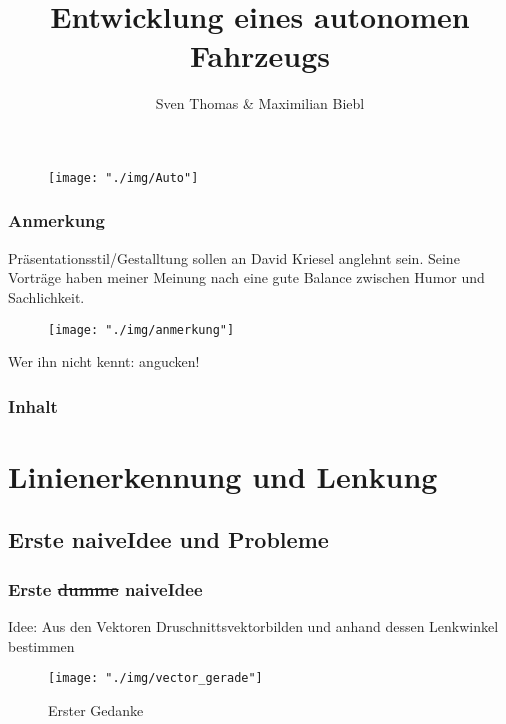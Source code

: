 \documentclass{beamer}
\title[]{Entwicklung eines autonomen Fahrzeugs}
\author{Sven Thomas \& Maximilian Biebl}
\institute[THM]{Technische Hochschule Mittelhessen}
\date{}
\begin{document}
	\begin{frame}
		\begin{center}
				\begin{figure}[h]
					\texttt{[image: "./img/Auto"]}
					\label{fig:Auto}
				\end{figure}
		\end{center}
		\titlepage
			
	\end{frame}
	\begin{frame}
		\frametitle{Anmerkung}
		Präsentationsstil/Gestalltung sollen an David Kriesel anglehnt sein. Seine Vorträge haben meiner Meinung nach eine gute Balance zwischen Humor und Sachlichkeit.
		\begin{center}
			\begin{figure}[h]
				\texttt{[image: "./img/anmerkung"]}
				\label{fig:anmerkung}
			\end{figure}
		\end{center}
		Wer ihn nicht kennt: angucken!
	\end{frame}
	\begin{frame}
		\frametitle{Inhalt}
		\tableofcontents
	\end{frame}

	\section{Linienerkennung und Lenkung}
	
	\subsection{Erste \glqq naive\grqq Idee und Probleme}

	\begin{frame}
		\frametitle{Erste \sout{dumme} \glqq naive\grqq  Idee}
		Idee: Aus den Vektoren \glqq Druschnittsvektor\grqq \space bilden  und anhand dessen Lenkwinkel bestimmen
		\begin{center}
			\begin{figure}[h]
				\texttt{[image: "./img/vector\_gerade"]}
				\caption{Erster Gedanke}
				\label{fig:Lenkung via Vektoren in Gerade}
			\end{figure}
		\end{center}
	\end{frame}
\end{document}
